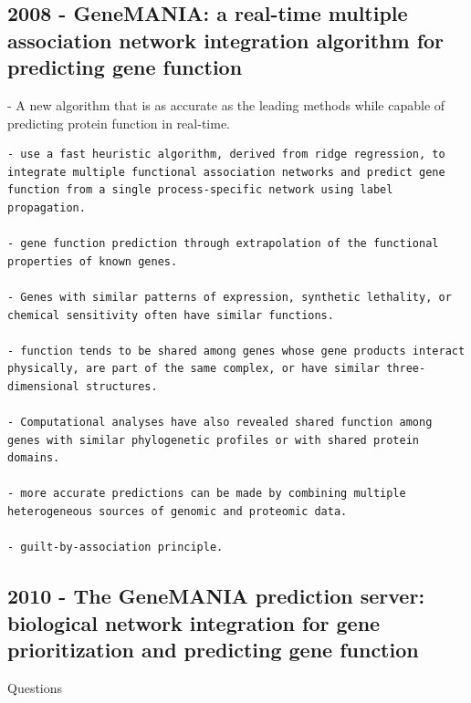 \documentclass[
]{book}
\begin{document}
\hypertarget{genemania-a-real-time-multiple-association-network-integration-algorithm-for-predicting-gene-function}{%
\subsection{2008 - GeneMANIA: a real-time multiple association network integration algorithm for predicting gene function}\label{genemania-a-real-time-multiple-association-network-integration-algorithm-for-predicting-gene-function}}

- A new algorithm that is as accurate as the leading methods while capable of predicting protein function in real-time.

\begin{verbatim}
- use a fast heuristic algorithm, derived from ridge regression, to integrate multiple functional association networks and predict gene function from a single process-specific network using label propagation.

- gene function prediction through extrapolation of the functional properties of known genes.

- Genes with similar patterns of expression, synthetic lethality, or chemical sensitivity often have similar functions.

- function tends to be shared among genes whose gene products interact physically, are part of the same complex, or have similar three-dimensional structures.

- Computational analyses have also revealed shared function among genes with similar phylogenetic profiles or with shared protein domains.

- more accurate predictions can be made by combining multiple heterogeneous sources of genomic and proteomic data.

- guilt-by-association principle.
\end{verbatim}

\hypertarget{the-genemania-prediction-server-biological-network-integration-for-gene-prioritization-and-predicting-gene-function}{%
\subsection{2010 - The GeneMANIA prediction server: biological network integration for gene prioritization and predicting gene function}\label{the-genemania-prediction-server-biological-network-integration-for-gene-prioritization-and-predicting-gene-function}}

Questions
\end{document}
